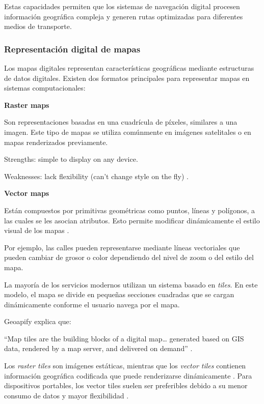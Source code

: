 Estas capacidades permiten que los sistemas de navegación digital procesen información geográfica compleja y generen rutas optimizadas para diferentes medios de transporte.\cite{esri_gis}

\subsubsection{Representación digital de mapas}

Los mapas digitales representan características geográficas mediante estructuras de datos digitales. Existen dos formatos principales para representar mapas en sistemas computacionales:

\textbf{Raster maps}

Son representaciones basadas en una cuadrícula de píxeles, similares a una imagen. Este tipo de mapas se utiliza comúnmente en imágenes satelitales o en mapas renderizados previamente.

Strengths: simple to display on any device.

Weaknesses: lack flexibility (can’t change style on the fly) \cite{geoapify_tiles}.

\textbf{Vector maps}

Están compuestos por primitivas geométricas como puntos, líneas y polígonos, a las cuales se les asocian atributos. Esto permite modificar dinámicamente el estilo visual de los mapas \cite{geoapify_tiles}.

Por ejemplo, las calles pueden representarse mediante líneas vectoriales que pueden cambiar de grosor o color dependiendo del nivel de zoom o del estilo del mapa.

La mayoría de los servicios modernos utilizan un sistema basado en \textit{tiles}. En este modelo, el mapa se divide en pequeñas secciones cuadradas que se cargan dinámicamente conforme el usuario navega por el mapa.

Geoapify explica que:

``Map tiles are the building blocks of a digital map… generated based on GIS data, rendered by a map server, and delivered on demand'' \cite{geoapify_tiles}.

Los \textit{raster tiles} son imágenes estáticas, mientras que los \textit{vector tiles} contienen información geográfica codificada que puede renderizarse dinámicamente \cite{geoapify_tiles}. Para dispositivos portables, los vector tiles suelen ser preferibles debido a su menor consumo de datos y mayor flexibilidad \cite{geoapify_tiles}.

